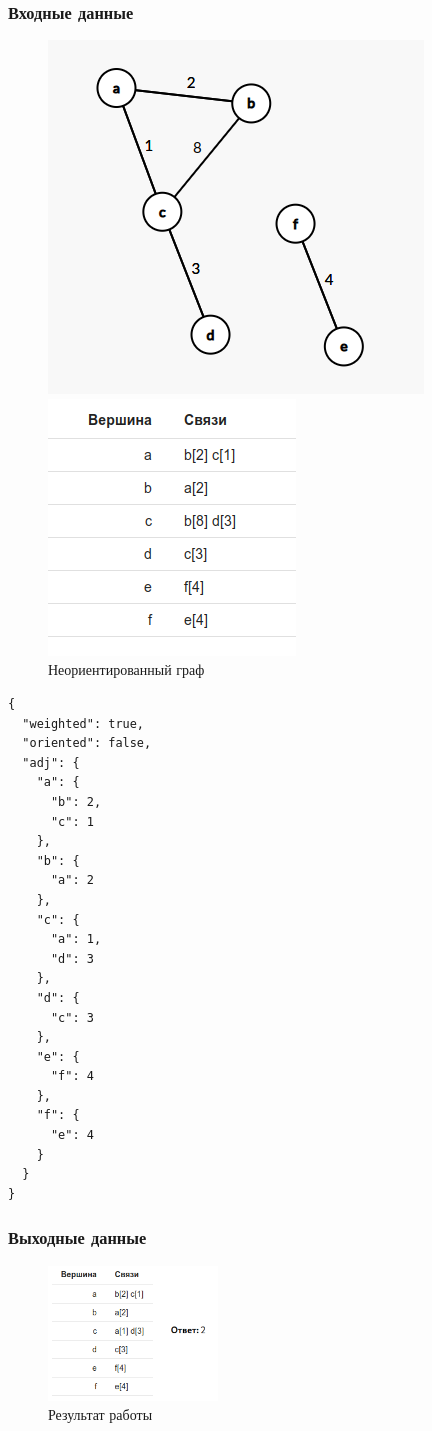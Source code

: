 \subsubsection{Входные данные}
\begin{figure}[H]
  \begin{minipage}{0.5\textwidth}
    \centering\includegraphics[width=0.6\linewidth]{figs/task-5/graph-5.png}
  \end{minipage}
  \begin{minipage}{0.5\textwidth}
    \centering\includegraphics[width=0.6\linewidth]{figs/task-5/adj-5.png}
  \end{minipage}
  \caption{Неориентированный граф}
\end{figure}

\begin{verbatim}
{
  "weighted": true,
  "oriented": false,
  "adj": {
    "a": {
      "b": 2,
      "c": 1
    },
    "b": {
      "a": 2
    },
    "c": {
      "a": 1,
      "d": 3
    },
    "d": {
      "c": 3
    },
    "e": {
      "f": 4
    },
    "f": {
      "e": 4
    }
  }
}
\end{verbatim}

\subsubsection{Выходные данные}
\begin{figure}[H]
  \centering\includegraphics[width=0.4\textwidth]{figs/task-5/res-5.png}
  \caption{Результат работы}
\end{figure}
